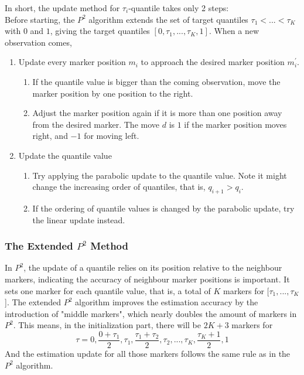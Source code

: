 In short, the update method for $\tau_i$-quantile takes only 2 steps:\\
Before starting, the $P^2$ algorithm extends the set of target quantiles $\tau_1 <... < \tau_K$ with $0$ and $1$, giving the target quantiles $[0, \tau_1, ..., \tau_K, 1]$.
When a new observation comes,
\begin{enumerate}
    \item Update every marker position $m_i$ to approach the desired marker position $m_i^\prime$.
    \begin{enumerate}
        \item If the quantile value is bigger than the coming observation, move the marker position by one position to the right.
        \item Adjust the marker position again if it is more than one position away from the desired marker. The move $d$ is $1$ if the marker position moves right, and $-1$ for moving left.
    \end{enumerate}
    \item Update the quantile value
    \begin{enumerate}
        \item Try applying the parabolic update to the quantile value. Note it might change the increasing order of quantiles, that is, $q_{i+1} > q_{i}$.
        \item If the ordering of quantile values is changed by the parabolic update, try the linear update instead.
    \end{enumerate}
\end{enumerate}


\subsubsection{The Extended $P^2$ Method}
In $P^2$, the update of a quantile relies on its position relative to the neighbour markers, indicating the accuracy of neighbour marker positions is important. 
It sets one marker for each quantile value, that is, a total of $K$ markers for [$\tau_1, ..., \tau_K$].
The extended $P^2$ algorithm improves the estimation accuracy by the introduction of "middle markers",  which nearly doubles the amount of markers in $P^2$. 
This means, in the initialization part, there will be $2K+3$ markers for
$$
\tau = 0, \frac{0+\tau_1}{2}, \tau_1, \frac{\tau_1 + \tau_2}{2}, \tau_2, ..., \tau_{K}, \frac{\tau_K+1}{2}, 1
$$
And the estimation update for all those markers follows the same rule as in the $P^2$ algorithm.

